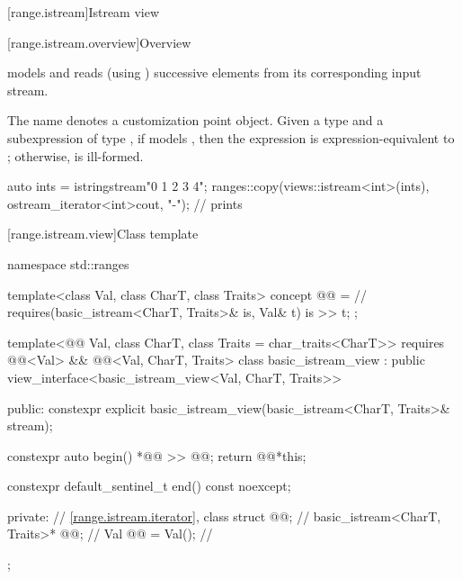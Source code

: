 [range.istream]{Istream view}

[range.istream.overview]{Overview}

\pnum
{} models  and
reads (using ) successive elements
from its corresponding input stream.

\pnum
The name  denotes
a customization point object.
Given a type  and a subexpression  of type ,
if  models
,
then the expression  is expression-equivalent to
;
otherwise,  is ill-formed.

\pnum
\begin{example}
\begin{codeblock}
auto ints = istringstream{"0 1  2   3     4"};
ranges::copy(views::istream<int>(ints), ostream_iterator<int>{cout, "-"});
// prints 
\end{codeblock}
\end{example}

[range.istream.view]{Class template }

%
\begin{codeblock}
namespace std::ranges {
  template<class Val, class CharT, class Traits>
    concept @@ =                // \expos
      requires(basic_istream<CharT, Traits>& is, Val& t) {
        is >> t;
      };

  template<@@ Val, class CharT, class Traits = char_traits<CharT>>
    requires @@<Val> &&
             @@<Val, CharT, Traits>
  class basic_istream_view : public view_interface<basic_istream_view<Val, CharT, Traits>> {
  public:
    constexpr explicit basic_istream_view(basic_istream<CharT, Traits>& stream);

    constexpr auto begin() {
      *@@ >> @@;
      return @@{*this};
    }

    constexpr default_sentinel_t end() const noexcept;

  private:
    // \ref{range.istream.iterator}, class 
    struct @@;                            // \expos
    basic_istream<CharT, Traits>* @@;      // \expos
    Val @@ = Val();                         // \expos
  };
}
\end{codeblock}

